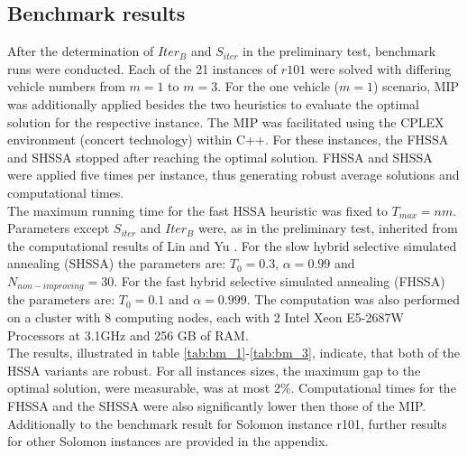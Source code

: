 \documentclass[final,5p,times,twocolumn]{elsarticle}
\begin{document}
{{{{{{{{{{{{\subsection{Benchmark results}
After the determination of $Iter_{B}$ and $S_{iter}$ in the preliminary test, benchmark runs were conducted. Each of the 21 instances of $r101$ were solved with differing vehicle numbers from $m=1$ to $m=3$. For the one vehicle ($m=1$) scenario, MIP was additionally applied besides the two heuristics to evaluate the optimal solution for the respective instance. The MIP was facilitated using the CPLEX environment (concert technology) within C++. For these instances, the FHSSA and SHSSA stopped after reaching the optimal solution. FHSSA and SHSSA were applied five times per instance, thus generating robust average solutions and computational times.\\ 
The maximum running time for the fast HSSA heuristic was fixed to $T_{max}=nm$. Parameters except $S_{iter}$ and $Iter_{B}$ were, as in the preliminary test, inherited from the computational results of Lin and Yu \cite{Lin:2012sa}. For the slow hybrid selective simulated annealing (SHSSA) the parameters are: $T_{0}=0.3$, $\alpha = 0.99$ and $N_{non-improving}=30$.  For the fast hybrid selective simulated annealing (FHSSA) the parameters are: $T_{0}=0.1$ and $\alpha = 0.999$. The computation was also performed on a cluster with 8 computing nodes, each with 2 Intel Xeon E5-2687W Processors at 3.1GHz and 256 GB of RAM. \\
The results, illustrated in table \ref{tab:bm_1}-\ref{tab:bm_3}, indicate, that both of the HSSA variants are robust. For all instances sizes, the maximum gap to the optimal solution, were measurable, was at most 2\%. Computational times for the FHSSA and the SHSSA were also significantly lower then those of the MIP. \\
Additionally to the benchmark result for Solomon instance r101, further results for other Solomon instances are provided in the appendix.\\ 
 

}}}}}}}}}}}}
\end{document}
